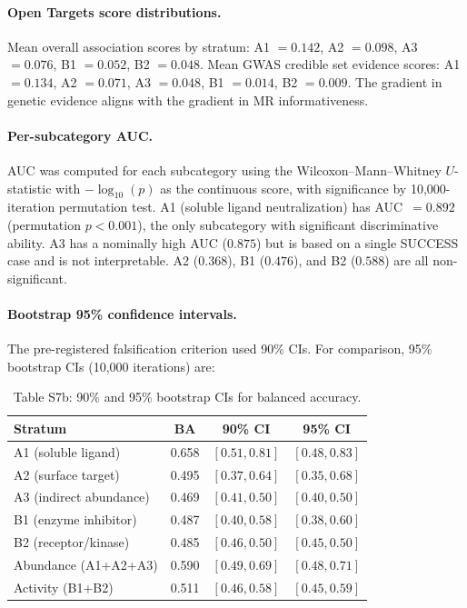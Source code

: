\documentclass[11pt]{article}
\begin{document}
\paragraph{Open Targets score distributions.}
Mean overall association scores by stratum: A1 $= 0.142$, A2 $= 0.098$, A3 $= 0.076$, B1 $= 0.052$, B2 $= 0.048$. Mean GWAS credible set evidence scores: A1 $= 0.134$, A2 $= 0.071$, A3 $= 0.048$, B1 $= 0.014$, B2 $= 0.009$. The gradient in genetic evidence aligns with the gradient in MR informativeness.

\paragraph{Per-subcategory AUC.}
AUC was computed for each subcategory using the Wilcoxon--Mann--Whitney $U$-statistic with $-\log_{10}(p)$ as the continuous score, with significance by 10{,}000-iteration permutation test. A1 (soluble ligand neutralization) has AUC~$= 0.892$ (permutation $p < 0.001$), the only subcategory with significant discriminative ability. A3 has a nominally high AUC ($0.875$) but is based on a single SUCCESS case and is not interpretable. A2 ($0.368$), B1 ($0.476$), and B2 ($0.588$) are all non-significant.

\paragraph{Bootstrap 95\% confidence intervals.}
The pre-registered falsification criterion used 90\% CIs. For comparison, 95\% bootstrap CIs (10{,}000 iterations) are:

\vspace{0.5em}
\begin{table}[H]
\centering
\caption{Table S7b: 90\% and 95\% bootstrap CIs for balanced accuracy.}
\small
\begin{tabular}{lccc}
\toprule
Stratum & BA & 90\% CI & 95\% CI \\
\midrule
A1 (soluble ligand) & 0.658 & $[0.51, 0.81]$ & $[0.48, 0.83]$ \\
A2 (surface target) & 0.495 & $[0.37, 0.64]$ & $[0.35, 0.68]$ \\
A3 (indirect abundance) & 0.469 & $[0.41, 0.50]$ & $[0.40, 0.50]$ \\
B1 (enzyme inhibitor) & 0.487 & $[0.40, 0.58]$ & $[0.38, 0.60]$ \\
B2 (receptor/kinase) & 0.485 & $[0.46, 0.50]$ & $[0.45, 0.50]$ \\
\midrule
Abundance (A1+A2+A3) & 0.590 & $[0.49, 0.69]$ & $[0.48, 0.71]$ \\
Activity (B1+B2) & 0.511 & $[0.46, 0.58]$ & $[0.45, 0.59]$ \\
\bottomrule
\end{tabular}
\end{table}
\end{document}
